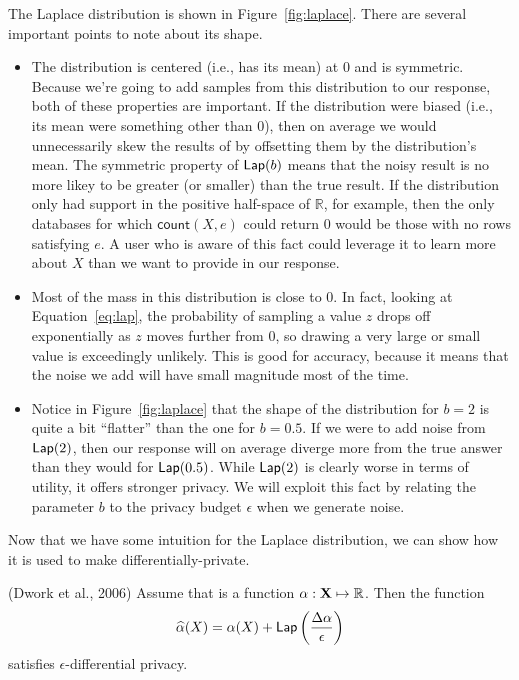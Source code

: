 \documentclass[11pt,twoside]{scrartcl}
\begin{document}
The Laplace distribution is shown in Figure~\ref{fig:laplace}. There are several important points to note about its shape.
\begin{itemize}
\item The distribution is centered (i.e., has its mean) at 0 and is symmetric. Because we're going to add samples from this distribution to our response, both of these properties are important. If the distribution were biased (i.e., its mean were something other than 0), then on average we would unnecessarily skew the results of \san by offsetting them by the distribution's mean. The symmetric property of $\mathsf{Lap}(b)$ means that the noisy result is no more likey to be greater (or smaller) than the true result. If the distribution only had support in the positive half-space of $\mathbb{R}$, for example, then the only databases for which $\mathsf{count}(X,e)$ could return 0 would be those with no rows satisfying $e$. A user who is aware of this fact could leverage it to learn more about $X$ than we want to provide in our response.

\item Most of the mass in this distribution is close to 0. In fact, looking at Equation~\ref{eq:lap}, the probability of sampling a value $z$ drops off exponentially as $z$ moves further from 0, so drawing a very large or small value is exceedingly unlikely. This is good for accuracy, because it means that the noise we add will have small magnitude most of the time.

\item Notice in Figure~\ref{fig:laplace} that the shape of the distribution for $b=2$ is quite a bit ``flatter'' than the one for $b=0.5$. If we were to add noise from $\mathsf{Lap}(2)$, then our response will on average diverge more from the true answer than they would for $\mathsf{Lap}(0.5)$. While $\mathsf{Lap}(2)$ is clearly worse in terms of utility, it offers stronger privacy. We will exploit this fact by relating the parameter $b$ to the privacy budget $\epsilon$ when we generate noise.
\end{itemize}

Now that we have some intuition for the Laplace distribution, we can show how it is used to make \san differentially-private.

\begin{theorem}{(Dwork et al., 2006)}
\label{thm:noise}
Assume that \san is a function $\alpha : \mathbf{X} \mapsto \mathbb{R}$. Then the function
\[
\widehat{\alpha}(X) = \alpha(X) + \mathsf{Lap}\left(\frac{\Delta\alpha}{\epsilon}\right)
\]
satisfies $\epsilon$-differential privacy.
\end{theorem}
\end{document}

